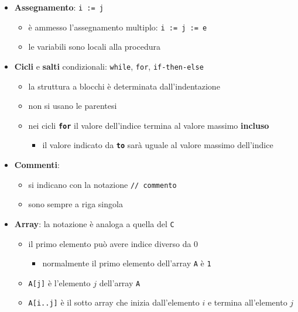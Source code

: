 \documentclass[italian, 10pt]{article}
\begin{document}
\begin{itemize}
  \item \textbf{Assegnamento}: \texttt{i := j}
        \begin{itemize}
          \item è ammesso l'assegnamento multiplo: \texttt{i := j := e}
          \item le variabili sono locali alla procedura
        \end{itemize}
  \item \textbf{Cicli} e \textbf{salti} condizionali: \texttt{while}, \texttt{for}, \texttt{if-then-else}
        \begin{itemize}
          \item la struttura a blocchi è determinata dall'indentazione
          \item non si usano le parentesi
          \item nei cicli \textbf{\texttt{for}} il valore dell'indice termina al valore massimo \textbf{incluso}
                \begin{itemize}
                  \item il valore indicato da \textbf{\texttt{to}} sarà uguale al valore massimo dell'indice
                \end{itemize}
        \end{itemize}
  \item \textbf{Commenti}:
        \begin{itemize}
          \item si indicano con la notazione \texttt{// commento}
          \item sono sempre a riga singola
        \end{itemize}
  \item \textbf{Array}: la notazione è analoga a quella del \texttt{C}
        \begin{itemize}
          \item il primo elemento può avere indice diverso da \(0\)
                \begin{itemize}
                  \item normalmente il primo elemento dell'array \texttt{A} è \texttt{1}
                \end{itemize}
          \item \texttt{A[j]} è l'elemento \(j\) dell'array \texttt{A}
          \item \texttt{A[i..j]} è il sotto array che inizia dall'elemento \(i\) e termina all'elemento \(j\)
        \end{itemize}

\end{itemize}
\end{document}
